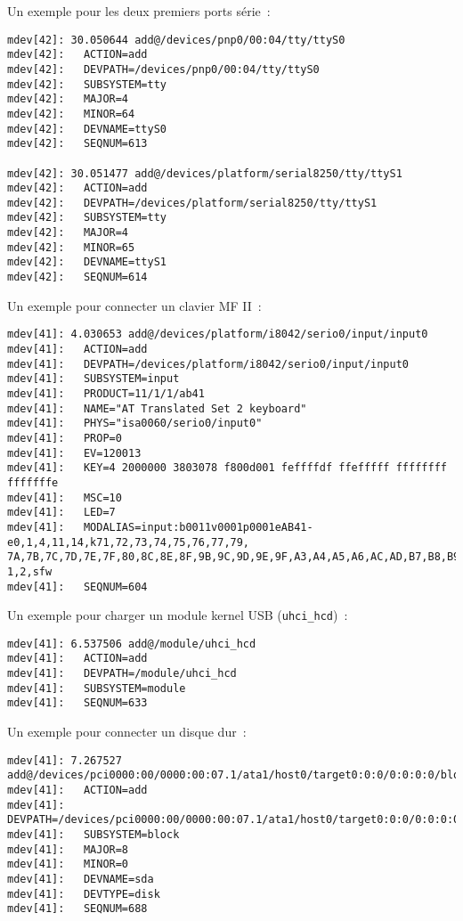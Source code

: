 Un exemple pour les deux premiers ports série~:

\begin{scriptsize}
\begin{verbatim}
mdev[42]: 30.050644 add@/devices/pnp0/00:04/tty/ttyS0
mdev[42]:   ACTION=add
mdev[42]:   DEVPATH=/devices/pnp0/00:04/tty/ttyS0
mdev[42]:   SUBSYSTEM=tty
mdev[42]:   MAJOR=4
mdev[42]:   MINOR=64
mdev[42]:   DEVNAME=ttyS0
mdev[42]:   SEQNUM=613

mdev[42]: 30.051477 add@/devices/platform/serial8250/tty/ttyS1
mdev[42]:   ACTION=add
mdev[42]:   DEVPATH=/devices/platform/serial8250/tty/ttyS1
mdev[42]:   SUBSYSTEM=tty
mdev[42]:   MAJOR=4
mdev[42]:   MINOR=65
mdev[42]:   DEVNAME=ttyS1
mdev[42]:   SEQNUM=614
\end{verbatim}
\end{scriptsize}

Un exemple pour connecter un clavier MF II~:

\begin{scriptsize}
\begin{verbatim}
mdev[41]: 4.030653 add@/devices/platform/i8042/serio0/input/input0
mdev[41]:   ACTION=add
mdev[41]:   DEVPATH=/devices/platform/i8042/serio0/input/input0
mdev[41]:   SUBSYSTEM=input
mdev[41]:   PRODUCT=11/1/1/ab41
mdev[41]:   NAME="AT Translated Set 2 keyboard"
mdev[41]:   PHYS="isa0060/serio0/input0"
mdev[41]:   PROP=0
mdev[41]:   EV=120013
mdev[41]:   KEY=4 2000000 3803078 f800d001 feffffdf ffefffff ffffffff fffffffe
mdev[41]:   MSC=10
mdev[41]:   LED=7
mdev[41]:   MODALIAS=input:b0011v0001p0001eAB41-e0,1,4,11,14,k71,72,73,74,75,76,77,79,
7A,7B,7C,7D,7E,7F,80,8C,8E,8F,9B,9C,9D,9E,9F,A3,A4,A5,A6,AC,AD,B7,B8,B9,D9,E2,ram4,l0,
1,2,sfw
mdev[41]:   SEQNUM=604
\end{verbatim}
\end{scriptsize}

Un exemple pour charger un module kernel USB (\texttt{uhci\_hcd})~:

\begin{scriptsize}
\begin{verbatim}
mdev[41]: 6.537506 add@/module/uhci_hcd
mdev[41]:   ACTION=add
mdev[41]:   DEVPATH=/module/uhci_hcd
mdev[41]:   SUBSYSTEM=module
mdev[41]:   SEQNUM=633
\end{verbatim}
\end{scriptsize}

Un exemple pour connecter un disque dur~:

\begin{scriptsize}
\begin{verbatim}
mdev[41]: 7.267527 add@/devices/pci0000:00/0000:00:07.1/ata1/host0/target0:0:0/0:0:0:0/block/sda
mdev[41]:   ACTION=add
mdev[41]:   DEVPATH=/devices/pci0000:00/0000:00:07.1/ata1/host0/target0:0:0/0:0:0:0/block/sda
mdev[41]:   SUBSYSTEM=block
mdev[41]:   MAJOR=8
mdev[41]:   MINOR=0
mdev[41]:   DEVNAME=sda
mdev[41]:   DEVTYPE=disk
mdev[41]:   SEQNUM=688
\end{verbatim}
\end{scriptsize}

